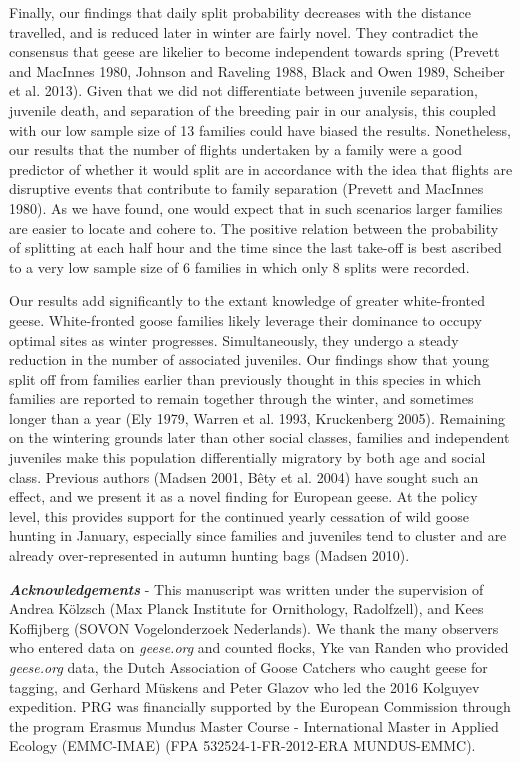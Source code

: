 \documentclass[10pt,twocolumn]{paper}
\begin{document}
Finally, our findings that daily split probability decreases with the
distance travelled, and is reduced later in winter are fairly novel.
They contradict the consensus that geese are likelier to become
independent towards spring (Prevett and MacInnes 1980, Johnson and
Raveling 1988, Black and Owen 1989, Scheiber et al. 2013). Given that we
did not differentiate between juvenile separation, juvenile death, and
separation of the breeding pair in our analysis, this coupled with our
low sample size of 13 families could have biased the results.
Nonetheless, our results that the number of flights undertaken by a
family were a good predictor of whether it would split are in accordance
with the idea that flights are disruptive events that contribute to
family separation (Prevett and MacInnes 1980). As we have found, one
would expect that in such scenarios larger families are easier to locate
and cohere to. The positive relation between the probability of
splitting at each half hour and the time since the last take-off is best
ascribed to a very low sample size of 6 families in which only 8 splits
were recorded.

Our results add significantly to the extant knowledge of greater
white-fronted geese. White-fronted goose families likely leverage their
dominance to occupy optimal sites as winter progresses. Simultaneously,
they undergo a steady reduction in the number of associated juveniles.
Our findings show that young split off from families earlier than
previously thought in this species in which families are reported to
remain together through the winter, and sometimes longer than a year
(Ely 1979, Warren et al. 1993, Kruckenberg 2005). Remaining on the
wintering grounds later than other social classes, families and
independent juveniles make this population differentially migratory by
both age and social class. Previous authors (Madsen 2001, Bêty et al.
2004) have sought such an effect, and we present it as a novel finding
for European geese. At the policy level, this provides support for the
continued yearly cessation of wild goose hunting in January, especially
since families and juveniles tend to cluster and are already
over-represented in autumn hunting bags (Madsen 2010).

{\small\textbf{\emph{Acknowledgements}} - This manuscript was written under the
supervision of Andrea Kölzsch (Max Planck Institute for Ornithology,
Radolfzell), and Kees Koffijberg (SOVON Vogelonderzoek Nederlands). We
thank the many observers who entered data on \emph{geese.org} and
counted flocks, Yke van Randen who provided \emph{geese.org} data, the
Dutch Association of Goose Catchers who caught geese for tagging, and
Gerhard Müskens and Peter Glazov who led the 2016 Kolguyev expedition.
PRG was financially supported by the European Commission through the
program Erasmus Mundus Master Course - International Master in Applied
Ecology (EMMC-IMAE) (FPA 532524-1-FR-2012-ERA MUNDUS-EMMC).}
\end{document}
